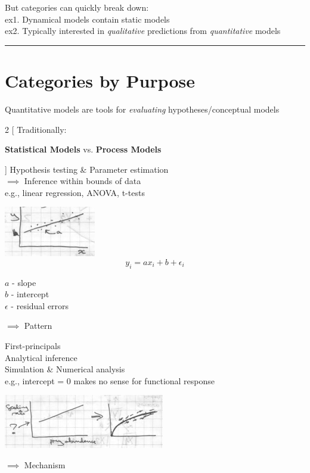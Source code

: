 \documentclass{article}
\begin{document}
But categories can quickly break down:\\
\-\hspace{1cm} ex1. Dynamical models contain static models\\
\-\hspace{1cm} ex2. Typically interested in \textit{qualitative} predictions from \textit{quantitative} models

\rule[0.5ex]{\linewidth}{1pt}


\section*{Categories by Purpose}
Quantitative models are tools for \textit{evaluating} hypotheses/conceptual models



\begin{multicols}{2}
	[
	Traditionally:
	\begin{center}
		\textbf{Statistical Models} vs. 	\textbf{Process Models}
	\end{center}
	]
	\setlength{\columnseprule}{0.2pt}
	Hypothesis testing \&
	Parameter estimation\\
	$\implies$ Inference within bounds of data\\
	e.g., linear regression, ANOVA, t-tests
	
	\begin{center}
	\includegraphics[width=4cm]{figs/img3}
	\begin{equation*}
		y_i = a x_i + b + \epsilon_i
	\end{equation*}

	$a$ - slope\\
	$b$ - intercept\\
	$\epsilon$ - residual errors

	$\implies$ Pattern
	
	\end{center}
	
	\columnbreak
	
	First-principals\\
	Analytical inference\\
	Simulation \& Numerical analysis\\
	
	e.g., intercept = 0 makes no sense for functional response
	\begin{center}
	\includegraphics[width=7cm]{figs/img4}
	
	$\implies$ Mechanism
	\end{center}
\end{multicols}
\end{document}
